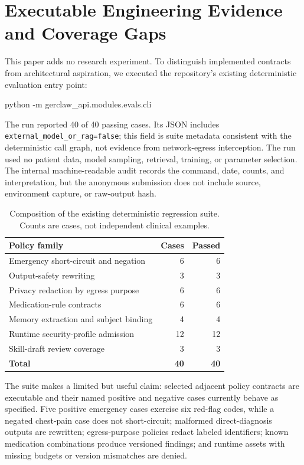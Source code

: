 \section{Executable Engineering Evidence and Coverage Gaps}
\label{sec:evidence}

This paper adds no research experiment.  To distinguish implemented contracts
from architectural aspiration, we executed the repository's existing
deterministic evaluation entry point:
\begin{center}
\small\ttfamily
python -m gerclaw\_api.modules.evals.cli
\end{center}
The run reported 40 of 40 passing cases.  Its JSON includes
\texttt{external\_model\_or\_rag=false}; this field is suite metadata
consistent with the deterministic call graph, not evidence from
network-egress interception.  The run used no patient data, model sampling,
retrieval, training, or parameter selection.  The internal machine-readable
audit records the command, date, counts, and interpretation, but the anonymous
submission does not include source, environment capture, or raw-output hash.

\begin{table}[t]
\caption{Composition of the existing deterministic regression suite.  Counts
are cases, not independent clinical examples.}
\label{tab:regressions}
\centering
\small
\begin{tabularx}{\linewidth}{@{}Xrr@{}}
\toprule
Policy family & Cases & Passed \\
\midrule
Emergency short-circuit and negation & 6 & 6 \\
Output-safety rewriting & 3 & 3 \\
Privacy redaction by egress purpose & 6 & 6 \\
Medication-rule contracts & 6 & 6 \\
Memory extraction and subject binding & 4 & 4 \\
Runtime security-profile admission & 12 & 12 \\
Skill-draft review coverage & 3 & 3 \\
\midrule
\textbf{Total} & \textbf{40} & \textbf{40} \\
\bottomrule
\end{tabularx}
\end{table}

The suite makes a limited but useful claim: selected adjacent policy contracts
are executable and their named positive and negative cases currently behave
as specified.  Five positive emergency cases exercise six red-flag codes,
while a negated chest-pain case does not short-circuit; malformed
direct-diagnosis outputs are rewritten; egress-purpose policies redact
labeled identifiers; known medication combinations produce versioned
findings; and runtime assets with missing budgets or version mismatches are
denied.

